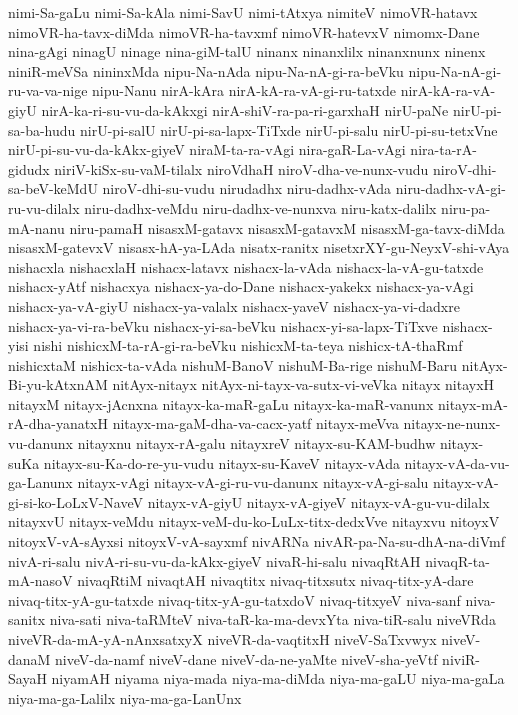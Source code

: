 {nimi-Sa-gaLu
nimi-Sa-kAla
nimi-SavU
nimi-tAtxya
nimiteV
nimoVR-hatavx
nimoVR-ha-tavx-diMda
nimoVR-ha-tavxmf
nimoVR-hatevxV
nimomx-Dane
nina-gAgi
ninagU
ninage
nina-giM-talU
ninanx
ninanxlilx
ninanxnunx
ninenx
niniR-meVSa
nininxMda
nipu-Na-nAda
nipu-Na-nA-gi-ra-beVku
nipu-Na-nA-gi-ru-va-va-nige
nipu-Nanu
nirA-kAra
nirA-kA-ra-vA-gi-ru-tatxde
nirA-kA-ra-vA-giyU
nirA-ka-ri-su-vu-da-kAkxgi
nirA-shiV-ra-pa-ri-garxhaH
nirU-paNe
nirU-pi-sa-ba-hudu
nirU-pi-salU
nirU-pi-sa-lapx-TiTxde
nirU-pi-salu
nirU-pi-su-tetxVne
nirU-pi-su-vu-da-kAkx-giyeV
niraM-ta-ra-vAgi
nira-gaR-La-vAgi
nira-ta-rA-gidudx
niriV-kiSx-su-vaM-tilalx
niroVdhaH
niroV-dha-ve-nunx-vudu
niroV-dhi-sa-beV-keMdU
niroV-dhi-su-vudu
nirudadhx
niru-dadhx-vAda
niru-dadhx-vA-gi-ru-vu-dilalx
niru-dadhx-veMdu
niru-dadhx-ve-nunxva
niru-katx-dalilx
niru-pa-mA-nanu
niru-pamaH
nisasxM-gatavx
nisasxM-gatavxM
nisasxM-ga-tavx-diMda
nisasxM-gatevxV
nisasx-hA-ya-LAda
nisatx-ranitx
nisetxrXY-gu-NeyxV-shi-vAya
nishacxla
nishacxlaH
nishacx-latavx
nishacx-la-vAda
nishacx-la-vA-gu-tatxde
nishacx-yAtf
nishacxya
nishacx-ya-do-Dane
nishacx-yakekx
nishacx-ya-vAgi
nishacx-ya-vA-giyU
nishacx-ya-valalx
nishacx-yaveV
nishacx-ya-vi-dadxre
nishacx-ya-vi-ra-beVku
nishacx-yi-sa-beVku
nishacx-yi-sa-lapx-TiTxve
nishacx-yisi
nishi
nishicxM-ta-rA-gi-ra-beVku
nishicxM-ta-teya
nishicx-tA-thaRmf
nishicxtaM
nishicx-ta-vAda
nishuM-BanoV
nishuM-Ba-rige
nishuM-Baru
nitAyx-Bi-yu-kAtxnAM
nitAyx-nitayx
nitAyx-ni-tayx-va-sutx-vi-veVka
nitayx
nitayxH
nitayxM
nitayx-jAcnxna
nitayx-ka-maR-gaLu
nitayx-ka-maR-vanunx
nitayx-mA-rA-dha-yanatxH
nitayx-ma-gaM-dha-va-cacx-yatf
nitayx-meVva
nitayx-ne-nunx-vu-danunx
nitayxnu
nitayx-rA-galu
nitayxreV
nitayx-su-KAM-budhw
nitayx-suKa
nitayx-su-Ka-do-re-yu-vudu
nitayx-su-KaveV
nitayx-vAda
nitayx-vA-da-vu-ga-Lanunx
nitayx-vAgi
nitayx-vA-gi-ru-vu-danunx
nitayx-vA-gi-salu
nitayx-vA-gi-si-ko-LoLxV-NaveV
nitayx-vA-giyU
nitayx-vA-giyeV
nitayx-vA-gu-vu-dilalx
nitayxvU
nitayx-veMdu
nitayx-veM-du-ko-LuLx-titx-dedxVve
nitayxvu
nitoyxV
nitoyxV-vA-sAyxsi
nitoyxV-vA-sayxmf
nivARNa
nivAR-pa-Na-su-dhA-na-diVmf
nivA-ri-salu
nivA-ri-su-vu-da-kAkx-giyeV
nivaR-hi-salu
nivaqRtAH
nivaqR-ta-mA-nasoV
nivaqRtiM
nivaqtAH
nivaqtitx
nivaq-titxsutx
nivaq-titx-yA-dare
nivaq-titx-yA-gu-tatxde
nivaq-titx-yA-gu-tatxdoV
nivaq-titxyeV
niva-sanf
niva-sanitx
niva-sati
niva-taRMteV
niva-taR-ka-ma-devxYta
niva-tiR-salu
niveVRda
niveVR-da-mA-yA-nAnxsatxyX
niveVR-da-vaqtitxH
niveV-SaTxvwyx
niveV-danaM
niveV-da-namf
niveV-dane
niveV-da-ne-yaMte
niveV-sha-yeVtf
niviR-SayaH
niyamAH
niyama
niya-mada
niya-ma-diMda
niya-ma-gaLU
niya-ma-gaLa
niya-ma-ga-Lalilx
niya-ma-ga-LanUnx
}
